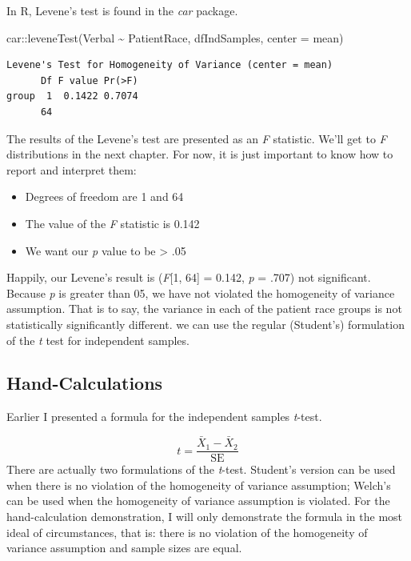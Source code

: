 \documentclass[
  11pt,
]{book}
\newenvironment{Shaded}{\begin{snugshade}}{\end{snugshade}}
\newcommand{\AttributeTok}[1]{\textcolor[rgb]{0.77,0.63,0.00}{#1}}
\newcommand{\FunctionTok}[1]{\textcolor[rgb]{0.00,0.00,0.00}{#1}}
\newcommand{\NormalTok}[1]{#1}
\newcommand{\SpecialCharTok}[1]{\textcolor[rgb]{0.00,0.00,0.00}{#1}}
\providecommand{\tightlist}{%
  \setlength{\itemsep}{0pt}\setlength{\parskip}{0pt}}
\begin{document}
In R, Levene's test is found in the \emph{car} package.

\begin{Shaded}
\begin{Highlighting}[]
\NormalTok{car}\SpecialCharTok{::}\FunctionTok{leveneTest}\NormalTok{(Verbal }\SpecialCharTok{\textasciitilde{}}\NormalTok{ PatientRace, dfIndSamples, }\AttributeTok{center =}\NormalTok{ mean)}
\end{Highlighting}
\end{Shaded}

\begin{verbatim}
Levene's Test for Homogeneity of Variance (center = mean)
      Df F value Pr(>F)
group  1  0.1422 0.7074
      64               
\end{verbatim}

The results of the Levene's test are presented as an \emph{F} statistic. We'll get to \emph{F} distributions in the next chapter. For now, it is just important to know how to report and interpret them:

\begin{itemize}
\tightlist
\item
  Degrees of freedom are 1 and 64
\item
  The value of the \emph{F} statistic is 0.142
\item
  We want our \emph{p} value to be \textgreater{} .05
\end{itemize}

Happily, our Levene's result is (\emph{F}{[}1, 64{]} = 0.142, \emph{p} = .707) not significant. Because \emph{p} is greater than 05, we have not violated the homogeneity of variance assumption. That is to say, the variance in each of the patient race groups is not statistically significantly different. we can use the regular (Student's) formulation of the \emph{t} test for independent samples.

\hypertarget{hand-calculations-1}{%
\subsection{Hand-Calculations}\label{hand-calculations-1}}

Earlier I presented a formula for the independent samples \emph{t}-test.

\[t = \frac{\bar{X}_1 - \bar{X}_2}{\mbox{SE}}\]
There are actually two formulations of the \emph{t}-test. Student's version can be used when there is no violation of the homogeneity of variance assumption; Welch's can be used when the homogeneity of variance assumption is violated. For the hand-calculation demonstration, I will only demonstrate the formula in the most ideal of circumstances, that is: there is no violation of the homogeneity of variance assumption and sample sizes are equal.
\end{document}
